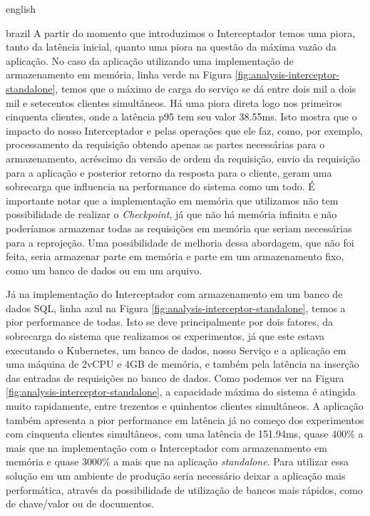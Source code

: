 \begin{otherlanguage*}{english}
\begin{otherlanguage*}{brazil}
A partir do momento que introduzimos o Interceptador temos uma piora, tanto da latência inicial,
quanto uma piora na questão da máxima vazão da aplicação. No caso da aplicação utilizando uma
implementação de armazenamento em memória, linha verde na Figura \ref{fig:analysis-interceptor-standalone},
temos que o máximo de carga do serviço se dá entre dois mil a dois mil e setecentos clientes
simultâneos. Há uma piora direta logo nos primeiros cinquenta clientes, onde a latência
p95 tem seu valor 38.55ms. Isto mostra que o impacto do nosso Interceptador e pelas
operações que ele faz, como, por exemplo, processamento da requisição obtendo apenas as
partes necessárias para o armazenamento, acréscimo da versão de ordem da requisição,
envio da requisição para a aplicação e posterior retorno da resposta para o cliente, geram
uma sobrecarga que influencia na performance do sistema como um todo. É importante notar que
a implementação em memória que utilizamos não tem possibilidade de realizar o \textit{Checkpoint},
já que não há memória infinita e não poderíamos armazenar todas as requisições em memória
que seriam necessárias para a reprojeção. Uma possibilidade de melhoria dessa abordagem,
que não foi feita, seria armazenar parte em memória e parte em um armazenamento fixo, como
um banco de dados ou em um arquivo.

Já na implementação do Interceptador com armazenamento em um banco de dados SQL, linha azul
na Figura \ref{fig:analysis-interceptor-standalone}, temos a pior performance de todas. Isto
se deve principalmente por dois fatores, da sobrecarga do sistema que realizamos os experimentos,
já que este estava executando o Kubernetes, um banco de dados, nosso Serviço e a aplicação
em uma máquina de 2vCPU e 4GB de memória, e também pela latência na inserção das entradas
de requisições no banco de dados. Como podemos ver na Figura \ref{fig:analysis-interceptor-standalone},
a capacidade máxima do sistema é atingida muito rapidamente, entre trezentos e quinhentos
clientes simultâneos. A aplicação também apresenta a pior performance em latência já no
começo dos experimentos com cinquenta clientes simultâneos, com uma latência de 151.94ms,
quase 400\% a mais que na implementação com o Interceptador com armazenamento em memória e
quase 3000\% a mais que na aplicação \textit{standalone}. Para utilizar essa solução em
um ambiente de produção seria necessário deixar a aplicação mais performática, através da
possibilidade de utilização de bancos mais rápidos, como de chave/valor ou de documentos.


\end{otherlanguage*}
\end{otherlanguage*}
